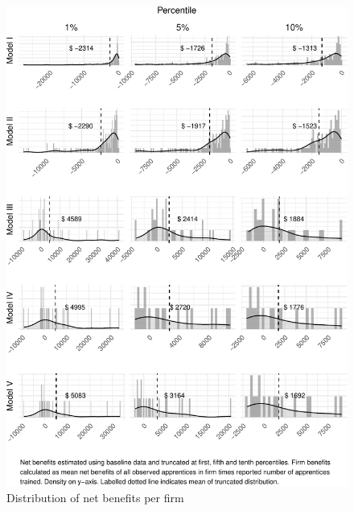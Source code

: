 \documentclass[
  a4paper, twoside, 12pt]{book}
\begin{document}
\begin{figure}[H]
\includegraphics[width=1\linewidth,]{figures/fig-firmhist-1} \caption{Distribution of net benefits per firm}\label{fig:fig-firmhist}
\end{figure}
\end{document}
